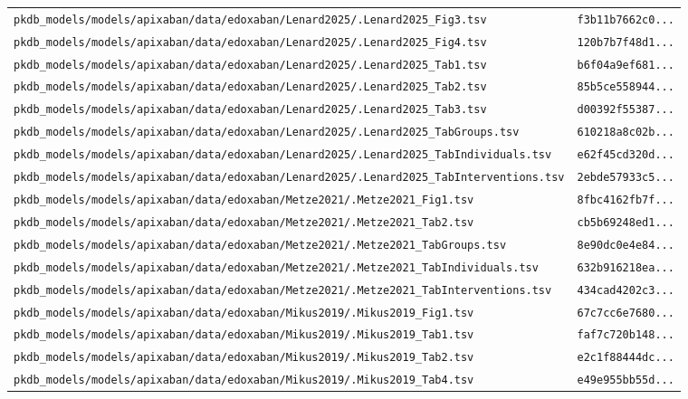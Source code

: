 \begin{longtable}{ll}
\texttt{pkdb\_models/models/apixaban/data/edoxaban/Lenard2025/.Lenard2025\_Fig3.tsv} & \texttt{f3b11b7662c0...} \\
\texttt{pkdb\_models/models/apixaban/data/edoxaban/Lenard2025/.Lenard2025\_Fig4.tsv} & \texttt{120b7b7f48d1...} \\
\texttt{pkdb\_models/models/apixaban/data/edoxaban/Lenard2025/.Lenard2025\_Tab1.tsv} & \texttt{b6f04a9ef681...} \\
\texttt{pkdb\_models/models/apixaban/data/edoxaban/Lenard2025/.Lenard2025\_Tab2.tsv} & \texttt{85b5ce558944...} \\
\texttt{pkdb\_models/models/apixaban/data/edoxaban/Lenard2025/.Lenard2025\_Tab3.tsv} & \texttt{d00392f55387...} \\
\texttt{pkdb\_models/models/apixaban/data/edoxaban/Lenard2025/.Lenard2025\_TabGroups.tsv} & \texttt{610218a8c02b...} \\
\texttt{pkdb\_models/models/apixaban/data/edoxaban/Lenard2025/.Lenard2025\_TabIndividuals.tsv} & \texttt{e62f45cd320d...} \\
\texttt{pkdb\_models/models/apixaban/data/edoxaban/Lenard2025/.Lenard2025\_TabInterventions.tsv} & \texttt{2ebde57933c5...} \\
\texttt{pkdb\_models/models/apixaban/data/edoxaban/Metze2021/.Metze2021\_Fig1.tsv} & \texttt{8fbc4162fb7f...} \\
\texttt{pkdb\_models/models/apixaban/data/edoxaban/Metze2021/.Metze2021\_Tab2.tsv} & \texttt{cb5b69248ed1...} \\
\texttt{pkdb\_models/models/apixaban/data/edoxaban/Metze2021/.Metze2021\_TabGroups.tsv} & \texttt{8e90dc0e4e84...} \\
\texttt{pkdb\_models/models/apixaban/data/edoxaban/Metze2021/.Metze2021\_TabIndividuals.tsv} & \texttt{632b916218ea...} \\
\texttt{pkdb\_models/models/apixaban/data/edoxaban/Metze2021/.Metze2021\_TabInterventions.tsv} & \texttt{434cad4202c3...} \\
\texttt{pkdb\_models/models/apixaban/data/edoxaban/Mikus2019/.Mikus2019\_Fig1.tsv} & \texttt{67c7cc6e7680...} \\
\texttt{pkdb\_models/models/apixaban/data/edoxaban/Mikus2019/.Mikus2019\_Tab1.tsv} & \texttt{faf7c720b148...} \\
\texttt{pkdb\_models/models/apixaban/data/edoxaban/Mikus2019/.Mikus2019\_Tab2.tsv} & \texttt{e2c1f88444dc...} \\
\texttt{pkdb\_models/models/apixaban/data/edoxaban/Mikus2019/.Mikus2019\_Tab4.tsv} & \texttt{e49e955bb55d...} \\

\end{longtable}
